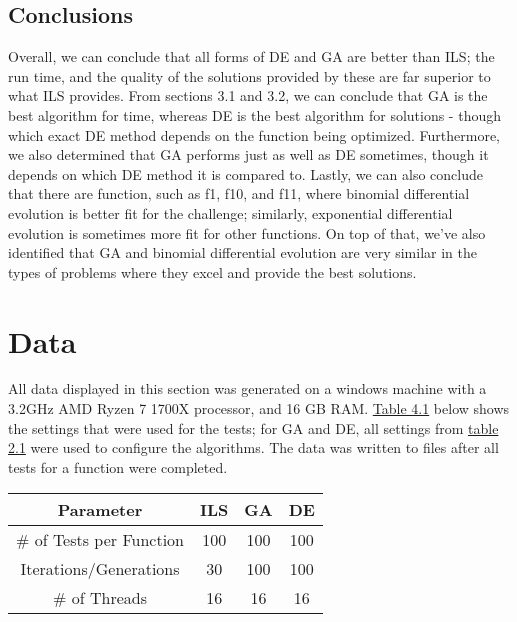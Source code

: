 \documentclass[paper=a4, fontsize=11pt]{scrartcl} %
\numberwithin{equation}{section} %
\numberwithin{figure}{section} %
\numberwithin{table}{section} %
\begin{document}
	\subsection{Conclusions}
		Overall, we can conclude that all forms of DE and GA are better than ILS; the run time, and the quality of the solutions provided by these are far superior to what ILS provides. From sections 3.1 and 3.2, we can conclude that GA is the best algorithm for time, whereas DE is the best algorithm for solutions - though which exact DE method depends on the function being optimized. Furthermore, we also determined that GA performs just as well as DE sometimes, though it depends on which DE method it is compared to. Lastly, we can also conclude that there are function, such as f1, f10, and f11, where binomial differential evolution is better fit for the challenge; similarly, exponential differential evolution is sometimes more fit for other functions. On top of that, we've also identified that GA and binomial differential evolution are very similar in the types of problems where they excel and provide the best solutions.
	 

	
\section{Data} \label{S4}
	All data displayed in this section was generated on a windows machine with a 3.2GHz AMD Ryzen 7 1700X processor, and 16 GB RAM. \hyperref[T41]{Table 4.1} below shows the settings that were used for the tests; for GA and DE, all settings from \hyperref[T21]{table 2.1} were used to configure the algorithms. The data was written to files after all tests for a function were completed.\\ 

	\begin{minipage}{\linewidth}
		\centering
		\begin{tabular}{c|ccc}\label{T41}
			Parameter       			& ILS			& GA 		& DE   		\\
			\hline
			\# of Tests per Function		& 100			& 100		& 100		\\
			Iterations/Generations		& 30			& 100		& 100		\\
			\# of Threads				& 16			& 16		& 16		\\
		\end{tabular}
		\bigskip\\
	\end{minipage}
\end{document}
